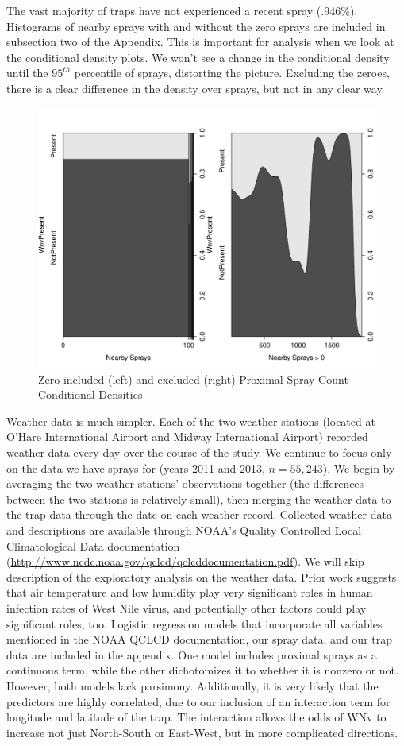 \documentclass[12pt]{article}
\begin{document}
The vast majority of traps have not experienced a recent spray ($.946\%$). Histograms of nearby sprays with and without the zero sprays are included in subsection two of the Appendix. This is important for analysis when we look at the conditional density plots. We won't see a change in the conditional density until the $95^{th}$ percentile of sprays, distorting the picture. Excluding the zeroes, there is a clear difference in the density over sprays, but not in any clear way.
\begin{figure}[H] \center
\includegraphics[scale=.35]{CD_NearbySpraysVSwnv.pdf}
\caption*{Zero included (left) and excluded (right) Proximal Spray Count Conditional Densities}
\end{figure}

Weather data is much simpler. Each of the two weather stations (located at O'Hare International Airport and Midway International Airport) recorded weather data every day over the course of the study. We continue to focus only on the data we have sprays for (years 2011 and 2013, $n=55,243$). We begin by averaging the two weather stations' observations together (the differences between the two stations is relatively small), then merging the weather data to the trap data through the date on each weather record. Collected weather data and descriptions are available through NOAA's Quality Controlled Local Climatological Data documentation (\url{http://www.ncdc.noaa.gov/qclcd/qclcddocumentation.pdf}). We will skip description of the exploratory analysis on the weather data. Prior work\cite{ruiz2009local} suggests that air temperature and low humidity play very significant roles in human infection rates of West Nile virus, and potentially other factors could play significant roles, too. Logistic regression models that incorporate all variables mentioned in the NOAA QCLCD documentation, our spray data, and our trap data are included in the appendix. One model includes proximal sprays as a continuous term, while the other dichotomizes it to whether it is nonzero or not. However, both models lack parsimony. Additionally, it is very likely that the predictors are highly correlated, due to our inclusion of an interaction term for longitude and latitude of the trap. The interaction allows the odds of WNv to increase not just North-South or East-West, but in more complicated directions. 
\end{document}
